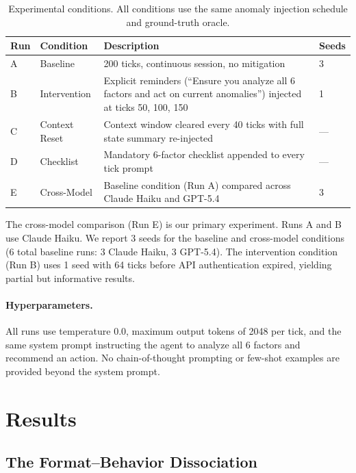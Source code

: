 \documentclass{article}
\begin{document}
\begin{table}[h]
\centering
\caption{Experimental conditions. All conditions use the same anomaly
injection schedule and ground-truth oracle.}
\label{tab:configs}
\begin{tabular}{@{}llp{6.5cm}l@{}}
\toprule
\textbf{Run} & \textbf{Condition} & \textbf{Description} &
\textbf{Seeds} \\
\midrule
A & Baseline & 200 ticks, continuous session, no mitigation & 3 \\
B & Intervention & Explicit reminders (``Ensure you analyze all 6
factors and act on current anomalies'') injected at ticks 50, 100, 150 &
1 \\
C & Context Reset & Context window cleared every 40 ticks with full
state summary re-injected & --- \\
D & Checklist & Mandatory 6-factor checklist appended to every tick
prompt & --- \\
E & Cross-Model & Baseline condition (Run A) compared across Claude
Haiku and GPT-5.4 & 3 \\
\bottomrule
\end{tabular}
\end{table}

The cross-model comparison (Run E) is our primary experiment. Runs A and
B use Claude Haiku. We report 3 seeds for the baseline and cross-model
conditions (6 total baseline runs: 3 Claude Haiku, 3 GPT-5.4). The
intervention condition (Run B) uses 1 seed with 64 ticks before API
authentication expired, yielding partial but informative results.

\paragraph{Hyperparameters.} All runs use temperature 0.0, maximum
output tokens of 2048 per tick, and the same system prompt instructing
the agent to analyze all 6 factors and recommend an action. No
chain-of-thought prompting or few-shot examples are provided beyond the
system prompt.

\section{Results}
\label{sec:results}

\subsection{The Format--Behavior Dissociation}
\label{sec:format_behavior}
\end{document}

